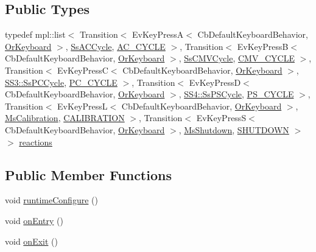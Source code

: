 \subsection*{Public Types}
\begin{DoxyCompactItemize}
\item 
typedef mpl\+::list$<$ Transition$<$ Ev\+Key\+PressA$<$ Cb\+Default\+Keyboard\+Behavior, \hyperlink{classsm__respira__1_1_1OrKeyboard}{Or\+Keyboard} $>$, \hyperlink{structsm__respira__1_1_1SsACCycle}{Ss\+A\+C\+Cycle}, \hyperlink{structsm__respira__1_1_1StObserve_1_1AC__CYCLE}{A\+C\+\_\+\+C\+Y\+C\+LE} $>$, Transition$<$ Ev\+Key\+PressB$<$ Cb\+Default\+Keyboard\+Behavior, \hyperlink{classsm__respira__1_1_1OrKeyboard}{Or\+Keyboard} $>$, \hyperlink{structsm__respira__1_1_1SsCMVCycle}{Ss\+C\+M\+V\+Cycle}, \hyperlink{structsm__respira__1_1_1StObserve_1_1CMV__CYCLE}{C\+M\+V\+\_\+\+C\+Y\+C\+LE} $>$, Transition$<$ Ev\+Key\+PressC$<$ Cb\+Default\+Keyboard\+Behavior, \hyperlink{classsm__respira__1_1_1OrKeyboard}{Or\+Keyboard} $>$, \hyperlink{structsm__respira__1_1_1SS3_1_1SsPCCycle}{S\+S3\+::\+Ss\+P\+C\+Cycle}, \hyperlink{structsm__respira__1_1_1StObserve_1_1PC__CYCLE}{P\+C\+\_\+\+C\+Y\+C\+LE} $>$, Transition$<$ Ev\+Key\+PressD$<$ Cb\+Default\+Keyboard\+Behavior, \hyperlink{classsm__respira__1_1_1OrKeyboard}{Or\+Keyboard} $>$, \hyperlink{structsm__respira__1_1_1SS4_1_1SsPSCycle}{S\+S4\+::\+Ss\+P\+S\+Cycle}, \hyperlink{structsm__respira__1_1_1StObserve_1_1PS__CYCLE}{P\+S\+\_\+\+C\+Y\+C\+LE} $>$, Transition$<$ Ev\+Key\+PressL$<$ Cb\+Default\+Keyboard\+Behavior, \hyperlink{classsm__respira__1_1_1OrKeyboard}{Or\+Keyboard} $>$, \hyperlink{classsm__respira__1_1_1MsCalibration}{Ms\+Calibration}, \hyperlink{structsm__respira__1_1_1StObserve_1_1CALIBRATION}{C\+A\+L\+I\+B\+R\+A\+T\+I\+ON} $>$, Transition$<$ Ev\+Key\+PressS$<$ Cb\+Default\+Keyboard\+Behavior, \hyperlink{classsm__respira__1_1_1OrKeyboard}{Or\+Keyboard} $>$, \hyperlink{classsm__respira__1_1_1MsShutdown}{Ms\+Shutdown}, \hyperlink{structsm__respira__1_1_1StObserve_1_1SHUTDOWN}{S\+H\+U\+T\+D\+O\+WN} $>$ $>$ \hyperlink{structsm__respira__1_1_1StObserve_a97f211aa3493cec1e620743b074add48}{reactions}
\end{DoxyCompactItemize}
\subsection*{Public Member Functions}
\begin{DoxyCompactItemize}
\item 
void \hyperlink{structsm__respira__1_1_1StObserve_a3c1fe027b9396233475e8bd94fed6df7}{runtime\+Configure} ()
\item 
void \hyperlink{structsm__respira__1_1_1StObserve_a4aa08a7d0471453573d7ad4f4d6797ed}{on\+Entry} ()
\item 
void \hyperlink{structsm__respira__1_1_1StObserve_a1491b333b722854794cc61e55ff7015a}{on\+Exit} ()
\end{DoxyCompactItemize}
